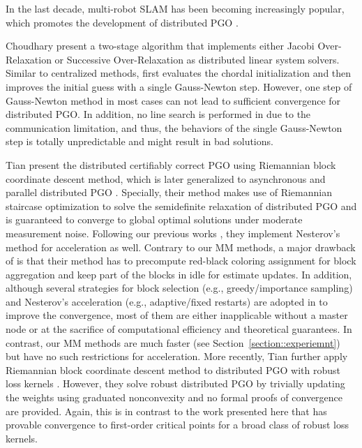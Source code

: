 In the last decade, multi-robot SLAM has been becoming increasingly popular, which promotes the development of distributed PGO \cite{choudhary2017distributed,tian2019distributed,tron2014distributed,eric2020geod}.

Choudhary \ea \cite{choudhary2017distributed} present a two-stage algorithm that implements either Jacobi Over-Relaxation or  Successive Over-Relaxation as distributed linear system solvers. Similar to centralized methods, \cite{choudhary2017distributed} first evaluates the chordal initialization \cite{carlone2015initialization} and then improves the initial guess with a single Gauss-Newton step. However, one step of Gauss-Newton method in most cases can not lead to sufficient convergence for distributed PGO. In addition, no line search is performed in \cite{choudhary2017distributed} due to the communication limitation, and thus, the behaviors of the single Gauss-Newton step is totally unpredictable and might result in bad solutions.

Tian \ea \cite{tian2019distributed} present the distributed certifiably correct PGO using Riemannian block coordinate descent method, which is later generalized to asynchronous and parallel distributed PGO \cite{tian2020asynchronous}. Specially, their method makes use of Riemannian staircase optimization to solve the semidefinite relaxation of distributed PGO and is guaranteed to converge to global optimal solutions under moderate measurement noise. Following our previous works \cite{fan2020mm,fan2019proximal}, they implement Nesterov's method for acceleration as well. Contrary to our MM methods, a major drawback of \cite{tian2019distributed} is that their method has to precompute red-black coloring assignment for block aggregation and keep part of the blocks in idle for estimate updates. In addition, although several strategies for block selection (e.g., greedy/importance sampling) and Nesterov's acceleration (e.g., adaptive/fixed restarts) are adopted in \cite{tian2019distributed} to improve the convergence, most of them are either inapplicable without a master node or at the sacrifice of computational efficiency and theoretical guarantees. In contrast, our MM methods are much faster (see Section~\ref{section::experiemnt}) but have no such restrictions for acceleration. More recently, Tian \ea  further apply Riemannian block coordinate descent method to distributed PGO with robust loss kernels \cite{tian2021kimera}. However, they solve robust distributed PGO by trivially updating the weights using graduated nonconvexity \cite{yang2020graduated} and no formal proofs of convergence are provided. Again, { this is  in contrast to the work} presented here that has provable convergence to first-order critical points for a broad class of robust loss kernels.


